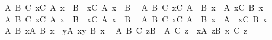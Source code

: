 \begin{isabellebody}
\ \ {\isachardoublequoteopen}{\isasymAnd}A\ B\ C{\isachardot}{\kern0pt}\ {\isacharparenleft}{\kern0pt}{\isasymUnion}x{\isasymin}C{\isachardot}{\kern0pt}\ A\ x\ {\isasyminter}\ B{\isacharparenright}{\kern0pt}\ {\isacharequal}{\kern0pt}\ {\isacharparenleft}{\kern0pt}{\isacharparenleft}{\kern0pt}{\isasymUnion}x{\isasymin}C{\isachardot}{\kern0pt}\ A\ x{\isacharparenright}{\kern0pt}\ {\isasyminter}\ B{\isacharparenright}{\kern0pt}{\isachardoublequoteclose}\isanewline
\ \ {\isachardoublequoteopen}{\isasymAnd}A\ B\ C{\isachardot}{\kern0pt}\ {\isacharparenleft}{\kern0pt}{\isasymUnion}x{\isasymin}C{\isachardot}{\kern0pt}\ A\ {\isasyminter}\ B\ x{\isacharparenright}{\kern0pt}\ {\isacharequal}{\kern0pt}\ {\isacharparenleft}{\kern0pt}A\ {\isasyminter}{\isacharparenleft}{\kern0pt}{\isasymUnion}x{\isasymin}C{\isachardot}{\kern0pt}\ B\ x{\isacharparenright}{\kern0pt}{\isacharparenright}{\kern0pt}{\isachardoublequoteclose}\isanewline
\ \ {\isachardoublequoteopen}{\isasymAnd}A\ B\ C{\isachardot}{\kern0pt}\ {\isacharparenleft}{\kern0pt}{\isasymUnion}x{\isasymin}C{\isachardot}{\kern0pt}\ A\ x\ {\isacharminus}{\kern0pt}\ B{\isacharparenright}{\kern0pt}\ {\isacharequal}{\kern0pt}\ {\isacharparenleft}{\kern0pt}{\isacharparenleft}{\kern0pt}{\isasymUnion}x{\isasymin}C{\isachardot}{\kern0pt}\ A\ x{\isacharparenright}{\kern0pt}\ {\isacharminus}{\kern0pt}\ B{\isacharparenright}{\kern0pt}{\isachardoublequoteclose}\isanewline
\ \ {\isachardoublequoteopen}{\isasymAnd}A\ B\ C{\isachardot}{\kern0pt}\ {\isacharparenleft}{\kern0pt}{\isasymUnion}x{\isasymin}C{\isachardot}{\kern0pt}\ A\ {\isacharminus}{\kern0pt}\ B\ x{\isacharparenright}{\kern0pt}\ {\isacharequal}{\kern0pt}\ {\isacharparenleft}{\kern0pt}A\ {\isacharminus}{\kern0pt}\ {\isacharparenleft}{\kern0pt}{\isasymInter}x{\isasymin}C{\isachardot}{\kern0pt}\ B\ x{\isacharparenright}{\kern0pt}{\isacharparenright}{\kern0pt}{\isachardoublequoteclose}\isanewline
\ \ {\isachardoublequoteopen}{\isasymAnd}A\ B{\isachardot}{\kern0pt}\ {\isacharparenleft}{\kern0pt}{\isasymUnion}x{\isasymin}{\isasymUnion}A{\isachardot}{\kern0pt}\ B\ x{\isacharparenright}{\kern0pt}\ {\isacharequal}{\kern0pt}\ {\isacharparenleft}{\kern0pt}{\isasymUnion}y{\isasymin}A{\isachardot}{\kern0pt}\ {\isasymUnion}x{\isasymin}y{\isachardot}{\kern0pt}\ B\ x{\isacharparenright}{\kern0pt}{\isachardoublequoteclose}\isanewline
\ \ {\isachardoublequoteopen}{\isasymAnd}A\ B\ C{\isachardot}{\kern0pt}\ {\isacharparenleft}{\kern0pt}{\isasymUnion}z{\isasymin}{\isacharparenleft}{\kern0pt}{\isasymUnion}{\isacharparenleft}{\kern0pt}B\ {\isacharbackquote}{\kern0pt}\ A{\isacharparenright}{\kern0pt}{\isacharparenright}{\kern0pt}{\isachardot}{\kern0pt}\ C\ z{\isacharparenright}{\kern0pt}\ {\isacharequal}{\kern0pt}\ {\isacharparenleft}{\kern0pt}{\isasymUnion}x{\isasymin}A{\isachardot}{\kern0pt}\ {\isasymUnion}z{\isasymin}B\ x{\isachardot}{\kern0pt}\ C\ z{\isacharparenright}{\kern0pt}{\isachardoublequoteclose}\isanewline

\end{isabellebody}
